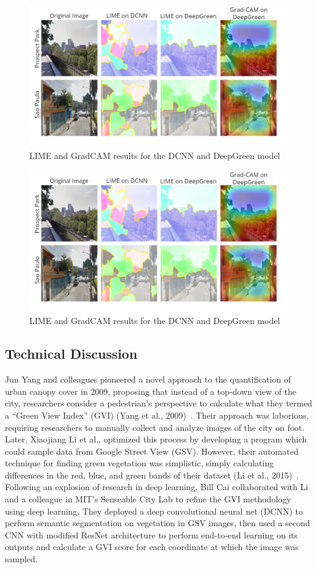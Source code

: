\begin{figure}[t]
    \centering
    \includegraphics[width=0.8\linewidth]{lime_gradcam.PNG}
    \caption{LIME and GradCAM results for the DCNN and DeepGreen model}
    \label{fig:result2}
\end{figure}

\begin{figure}[t]
    \centering
    \includegraphics[width=0.8\linewidth]{lime_gradcam.PNG}
    \caption{LIME and GradCAM results for the DCNN and DeepGreen model}
    \label{fig:result3}
\end{figure}

\subsection{Technical Discussion}

Jun Yang and colleagues pioneered a novel approach to the quantification of urban canopy cover in 2009, proposing that instead of a top-down view of the city, researchers consider a pedestrian’s perspective to calculate what they termed a “Green View Index” (GVI) (Yang et al., 2009)~\cite{Yang2009}. Their approach was laborious, requiring researchers to manually collect and analyze images of the city on foot. Later, Xiaojiang Li et al., optimized this process by developing a program which could sample data from Google Street View (GSV). However, their automated technique for finding green vegetation was simplistic, simply calculating differences in the red, blue, and green bands of their dataset (Li et al., 2015)~\cite{Li2015}. Following an explosion of research in deep learning, Bill Cai collaborated with Li and a colleague in MIT’s Senseable City Lab to refine the GVI methodology using deep learning. They deployed a deep convolutional neural net (DCNN) to perform semantic segmentation on vegetation in GSV images, then used a second CNN with modified ResNet architecture to perform end-to-end learning on its outputs and calculate a GVI score for each coordinate at which the image was sampled.

